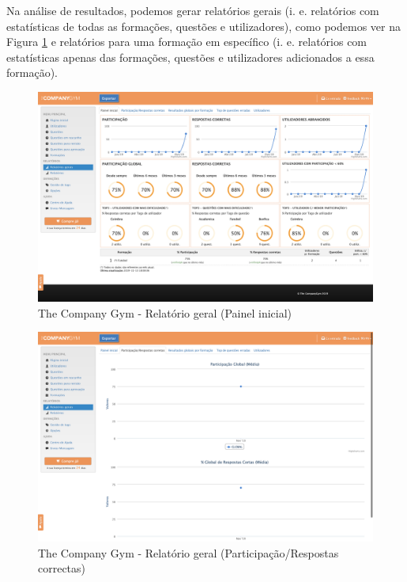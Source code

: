 \newpage

Na análise de resultados, podemos gerar relatórios gerais (i. e. relatórios com estatísticas de todas as formações, questões e utilizadores), como podemos ver na Figura \ref{fig:tcg-data}  e relatórios para uma formação em específico (i. e. relatórios com estatísticas apenas das formações, questões e utilizadores adicionados a essa formação). 

\begin{figure}[ht!]
	\begin{center}
		\includegraphics[width=1\textwidth]{img/tcg/tcg-data.png}
		\caption{The Company Gym - Relatório geral (Painel inicial)}
		\label{fig:tcg-data}
	\end{center}
\end{figure}

\newpage

\begin{figure}[ht!]
	\begin{center}
		\includegraphics[width=1\textwidth]{img/tcg/tcg-data1.png}
		\caption{The Company Gym - Relatório geral (Participação/Respostas correctas)}
		\label{fig:tcg-data1}
	\end{center}
\end{figure}

